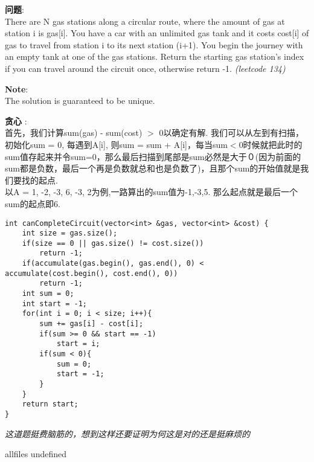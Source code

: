 \documentclass{article}
\begin{document}
\begin{CJK}{UTF8}{gbsn}     %

\else
    
\begin{description}
    \item{\textbf{问题}}:\\
There are N gas stations along a circular route, where the amount of gas at station i is gas[i].
You have a car with an unlimited gas tank and it costs cost[i] of gas to travel from station i to its next station (i+1). You begin the journey with an empty tank at one of the gas stations.
Return the starting gas station's index if you can travel around the circuit once, otherwise return -1. \textit{(leetcode 134)}
    \item{\textbf{Note}}:\\
The solution is guaranteed to be unique.
    \item{\textbf{贪心}} : 
    \\首先，我们计算sum(gas) - sum(cost) $>$ 0以确定有解. 我们可以从左到有扫描，初始化sum = 0, 每遇到A[i], 则sum = sum + A[i]，每当sum$<$0时候就把此时的sum值存起来并令sum=0，那么最后扫描到尾部是sum必然是大于０(因为前面的sum都是负数，最后一个再是负数就总和也是负数了)，且那个sum的开始值就是我们要找的起点.\\
以A = {1, -2, -3, 6, -3, 2}为例,一路算出的sum值为-1,-3,5. 那么起点就是最后一个sum的起点即6.
    \begin{lstlisting}
int canCompleteCircuit(vector<int> &gas, vector<int> &cost) {
	int size = gas.size();
	if(size == 0 || gas.size() != cost.size())
		return -1;
	if(accumulate(gas.begin(), gas.end(), 0) < accumulate(cost.begin(), cost.end(), 0))
		return -1;
	int sum = 0;
	int start = -1;
	for(int i = 0; i < size; i++){
		sum += gas[i] - cost[i];
		if(sum >= 0 && start == -1)
			start = i;
		if(sum < 0){
			sum = 0;
			start = -1;
		}
	}
	return start;
}
    \end{lstlisting}
    \textit{这道题挺费脑筋的，想到这样还要证明为何这是对的还是挺麻烦的}
\end{description}

\fi

\ifx allfiles undefined
\end{CJK}
\end{document}
